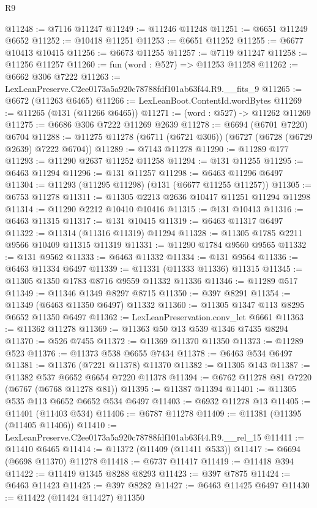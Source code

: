 \begin{lexlean}{R9}
\begin{coremodule}
@11248 := @7116 @11247
@11249 := @11246 @11248
@11251 := @6651 @11249 @6652
@11252 := @10418 @11251
@11253 := @6651 @11252
@11255 := @6677 @10413 @10415
@11256 := @6673 @11255
@11257 := @7119 @11247
@11258 := @11256 @11257
@11260 := fun (word : @527) => @11253 @11258
@11262 := @6662 @306 @7222
@11263 := LexLeanPreserve.C2ee0173a5a920c78788fdf101ab63f44.R9.__fits_9
@11265 := @6672 (@11263 @6465)
@11266 := LexLeanBoot.ContentId.wordBytes
@11269 := @11265 (@131 (@11266 @6465))
@11271 := (word : @527) -> @11262 @11269
@11275 := @6686 @306 @7222 @11269 @2639
@11278 := @6694 (@6701 @7220) @6704
@11288 := @11275 @11278 (@6711 (@6721 @306)) (@6727 (@6728 (@6729 @2639) @7222 @6704))
@11289 := @7143 @11278
@11290 := @11289 @177
@11293 := @11290 @2637 @11252 @11258
@11294 := @131 @11255
@11295 := @6463 @11294
@11296 := @131 @11257
@11298 := @6463 @11296 @6497
@11304 := @11293 (@11295 @11298) (@131 (@6677 @11255 @11257))
@11305 := @6753 @11278
@11311 := @11305 @2213 @2636 @10417 @11251 @11294 @11298
@11314 := @11290 @2212 @10410 @10416
@11315 := @131 @10413
@11316 := @6463 @11315
@11317 := @131 @10415
@11319 := @6463 @11317 @6497
@11322 := @11314 (@11316 @11319) @11294
@11328 := @11305 @1785 @2211 @9566 @10409 @11315 @11319
@11331 := @11290 @1784 @9560 @9565
@11332 := @131 @9562
@11333 := @6463 @11332
@11334 := @131 @9564
@11336 := @6463 @11334 @6497
@11339 := @11331 (@11333 @11336) @11315
@11345 := @11305 @1350 @1783 @8716 @9559 @11332 @11336
@11346 := @11289 @517
@11349 := @11346 @1349 @8297 @8715
@11350 := @397 @8291
@11354 := @11349 (@6463 @11350 @6497) @11332
@11360 := @11305 @1347 @113 @8295 @6652 @11350 @6497
@11362 := LexLeanPreservation.conv_let @6661
@11363 := @11362 @11278
@11369 := @11363 @50 @13 @539 @1346 @7435 @8294
@11370 := @526 @7455
@11372 := @11369 @11370 @11350
@11373 := @11289 @523
@11376 := @11373 @538 @6655 @7434
@11378 := @6463 @534 @6497
@11381 := @11376 (@7221 @11378) @11370
@11382 := @11305 @143
@11387 := @11382 @537 @6652 @6654 @7220 @11378
@11394 := @6762 @11278 @81 @7220 (@6767 (@6768 @11278 @81))
@11395 := @11387 @11394
@11401 := @11305 @535 @113 @6652 @6652 @534 @6497
@11403 := @6932 @11278 @13
@11405 := @11401 (@11403 @534)
@11406 := @6787 @11278
@11409 := @11381 (@11395 (@11405 @11406))
@11410 := LexLeanPreserve.C2ee0173a5a920c78788fdf101ab63f44.R9.__rel_15
@11411 := @11410 @6465
@11414 := @11372 (@11409 (@11411 @533))
@11417 := @6694 (@6698 @11370) @11278
@11418 := @6737 @11417
@11419 := @11418 @394
@11422 := @11419 @1345 @8288 @8293
@11423 := @397 @7875
@11424 := @6463 @11423
@11425 := @397 @8282
@11427 := @6463 @11425 @6497
@11430 := @11422 (@11424 @11427) @11350

\end{coremodule}
\end{lexlean}
